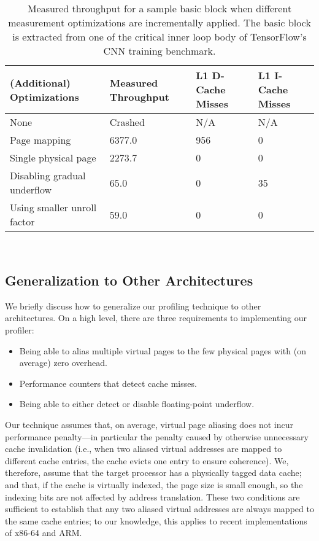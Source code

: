 \begin{table}
\begin{tabular}{
|p{}|p{}|p{}|p{}|}
\hline \textbf{(Additional) Optimizations} &
\textbf{Measured Throughput} &
\textbf{L1 D-Cache Misses} &
\textbf{L1 I-Cache Misses} \\

\hline
None & Crashed & N/A & N/A \\

\hline
Page mapping & 6377.0 & 956 & 0 \\

\hline
Single physical page & 2273.7 & 0 & 0 \\

\hline
Disabling gradual underflow & 65.0 & 0 & 35 \\

\hline
Using smaller unroll factor & 59.0 & 0 & 0\\

\hline
\end{tabular}
\\
\caption{Measured throughput for a sample basic block when
different measurement optimizations are incrementally applied.
The basic block is extracted from one of the critical 
inner loop body of TensorFlow\cite{tensorflow}'s CNN training benchmark.}
\label{tab:ablation}
\end{table}

\subsection{Generalization to Other Architectures}\label{sec:generalization}
We briefly discuss how to generalize our profiling technique to other architectures.
On a high level, there are three requirements to implementing our profiler:
\begin{itemize}
    \item Being able to alias multiple virtual pages to the few physical pages with 
    (on average) zero overhead.
    
    \item Performance counters that detect cache misses.
    
    \item Being able to either detect or disable floating-point underflow.
\end{itemize}

Our technique assumes that, on average, virtual page aliasing does not incur performance penalty---in particular the penalty 
caused by otherwise unnecessary cache invalidation 
(i.e., when two aliased virtual addresses are mapped to different cache entries,
the cache evicts one entry to ensure coherence).
We, therefore, assume that the target processor has a physically tagged 
data cache;
and that, if the cache is virtually indexed,
the page size is small enough, so the indexing bits are not affected by address translation.
These two conditions are sufficient to establish that any two aliased virtual addresses
are always mapped to the same cache entries;
to our knowledge, this applies to recent implementations of x86-64 and ARM.